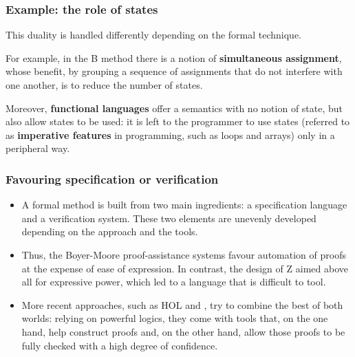 \documentclass[compress,dvipdfmx]{beamer}
\begin{document}
%
\begin{frame}
  \frametitle{Example: the role of states}

  This duality is handled differently depending on the formal
  technique.

  \bigskip

  For example, in the \textsf{B} method there is a notion of
  \textbf{simultaneous assignment}, whose benefit, by grouping a
  sequence of assignments that do not interfere with one another, is
  to reduce the number of states.

  \bigskip

  Moreover, \textbf{functional languages} offer a semantics with no
  notion of state, but also allow states to be used: it is left to the
  programmer to use states (referred to as \textbf{imperative
    features} in programming, such as loops and arrays) only in a
  peripheral way.

\end{frame}

%
\begin{frame}
\frametitle{Favouring specification or verification}
\begin{itemize}

  \item A formal method is built from two main ingredients: a
  specification language and a verification system. These two
  elements are unevenly developed depending on the approach and the
  tools.

  \item Thus, the Boyer-Moore proof-assistance systems favour
  automation of proofs at the expense of ease of expression. In
  contrast, the design of \textsf{Z} aimed above all for expressive
  power, which led to a language that is difficult to tool.

  \item More recent approaches, such as \textsf{HOL} and
  \Coq, try to combine the best of both worlds: relying on
  powerful logics, they come with tools that, on the one hand, help
  construct proofs and, on the other hand, allow those proofs to be
  fully checked with a high degree of confidence.

\end{itemize}

\end{frame}
\end{document}
